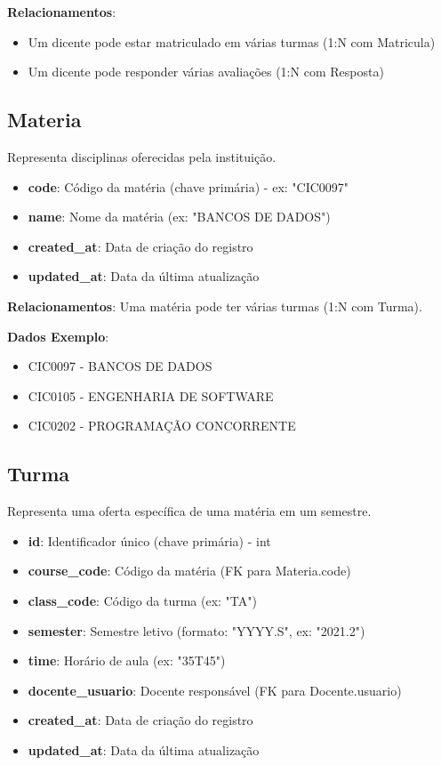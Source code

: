 \documentclass[a4paper,12pt]{article}
\begin{document}
\textbf{Relacionamentos}:
\begin{itemize}
    \item Um dicente pode estar matriculado em várias turmas (1:N com Matricula)
    \item Um dicente pode responder várias avaliações (1:N com Resposta)
\end{itemize}

\subsection{Materia}

Representa disciplinas oferecidas pela instituição.

\begin{itemize}
    \item \textbf{code}: Código da matéria (chave primária) - ex: "CIC0097"
    \item \textbf{name}: Nome da matéria (ex: "BANCOS DE DADOS")
    \item \textbf{created\_at}: Data de criação do registro
    \item \textbf{updated\_at}: Data da última atualização
\end{itemize}

\textbf{Relacionamentos}: Uma matéria pode ter várias turmas (1:N com Turma).

\textbf{Dados Exemplo}:
\begin{itemize}
    \item CIC0097 - BANCOS DE DADOS
    \item CIC0105 - ENGENHARIA DE SOFTWARE
    \item CIC0202 - PROGRAMAÇÃO CONCORRENTE
\end{itemize}

\subsection{Turma}

Representa uma oferta específica de uma matéria em um semestre.

\begin{itemize}
    \item \textbf{id}: Identificador único (chave primária) - int
    \item \textbf{course\_code}: Código da matéria (FK para Materia.code)
    \item \textbf{class\_code}: Código da turma (ex: "TA")
    \item \textbf{semester}: Semestre letivo (formato: "YYYY.S", ex: "2021.2")
    \item \textbf{time}: Horário de aula (ex: "35T45")
    \item \textbf{docente\_usuario}: Docente responsável (FK para Docente.usuario)
    \item \textbf{created\_at}: Data de criação do registro
    \item \textbf{updated\_at}: Data da última atualização
\end{itemize}
\end{document}
